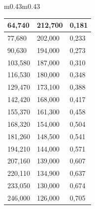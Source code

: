 \documentclass[a4paper,12pt]{article}
\theoremstyle{plain} %
\theoremstyle{definition} %
\theoremstyle{remark} %
\begin{document}
\begin{figure}[H]
\begin{tabular}{m{0.43\linewidth}m{0.43\linewidth}}
\begin{tabular}[r]{|l|l|l|}
64,740  & 212,700 & 0,181      \\ \hline
77,680  & 202,000 & 0,233      \\ \hline
90,630  & 194,000 & 0,273      \\ \hline
103,580 & 187,000 & 0,310      \\ \hline
116,530 & 180,000 & 0,348      \\ \hline
129,470 & 173,100 & 0,388      \\ \hline
142,420 & 168,000 & 0,417      \\ \hline
155,370 & 161,300 & 0,458      \\ \hline
168,320 & 154,000 & 0,504      \\ \hline
181,260 & 148,500 & 0,541      \\ \hline
194,210 & 144,000 & 0,571      \\ \hline
207,160 & 139,000 & 0,607      \\ \hline
220,110 & 134,900 & 0,637      \\ \hline
233,050 & 130,000 & 0,674      \\ \hline
246,000 & 126,000 & 0,705      \\ \hline

\end{tabular}
\end{tabular}
\end{figure}
\end{document}
